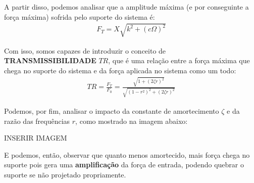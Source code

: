 \documentclass{article}
\begin{document}
            A partir disso, podemos analisar que a amplitude máxima (e por conseguinte a força máxima) sofrida pelo suporte do sistema é:
            \begin{align}
                F_T = X\sqrt{k^2 + (c \Omega)^2}
            \end{align}

            Com isso, somos capazes de introduzir o conceito de \textbf{TRANSMISSIBILIDADE} $TR$, que é uma relação entre a força máxima que chega no suporte do sistema e da força aplicada no sistema
            como um todo:
            \begin{align}
                TR = \frac{F_T}{F_0} = \frac{\sqrt{1 + (2 \zeta r)^2}}{\sqrt{(1 - r^2)^2 + (2 \zeta r)^2}}
            \end{align}

            Podemos, por fim, analisar o impacto da constante de amortecimento $\zeta$ e da razão das frequências $r$, como mostrado na imagem abaixo:

            INSERIR IMAGEM 

            E podemos, então, observar que quanto menos amortecido, mais força chega no suporte pois gera uma \textbf{amplificação} da força de entrada, podendo quebrar o suporte se não projetado propriamente.









            
\end{document}
